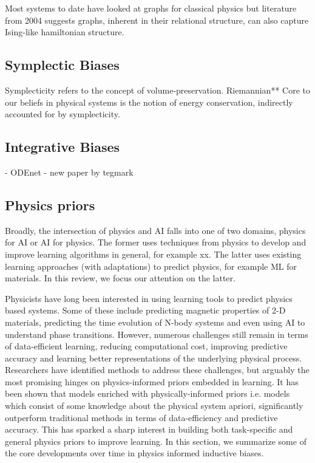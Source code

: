 \documentclass{article}
\begin{document}
Most systems to date have looked at graphs for classical physics but literature from 2004 suggests graphs, inherent in their relational structure, can also capture Ising-like hamiltonian structure.


\subsection{Symplectic Biases}

Symplecticity refers to the concept of volume-preservation. Riemannian**
Core to our beliefs in physical systems is the notion of energy conservation, indirectly accounted for by symplecticity.

\subsection{Integrative Biases}
- ODEnet
- new paper by tegmark

\subsection{Physics priors}


Broadly, the intersection of physics and AI falls into one of two domains, physics for AI or AI for physics. The former uses techniques from physics to develop and improve learning algorithms in general, for example xx. The latter uses existing learning approaches (with adaptations) to predict physics, for example ML for materials. In this review, we focus our attention on the latter.

Physicists have long been interested in using learning tools to predict physics based systems. Some of these include predicting magnetic properties of 2-D materials, predicting the time evolution of N-body systems and even using AI to understand phase transitions. However, numerous challenges still remain in terms of data-efficient learning, reducing computational cost, improving predictive accuracy and learning better representations of the underlying physical process. Researchers have identified methods to address these challenges, but arguably the most promising hinges on physics-informed priors embedded in learning. It has been shown that models enriched with physically-informed priors i.e. models which consist of some knowledge about the physical system apriori, significantly outperform traditional methods in terms of data-efficiency and predictive accuracy. This has sparked a sharp interest in building both task-specific and general physics priors to improve learning. In this section, we summarize some of the core developments over time in physics informed inductive biases. 
\end{document}
